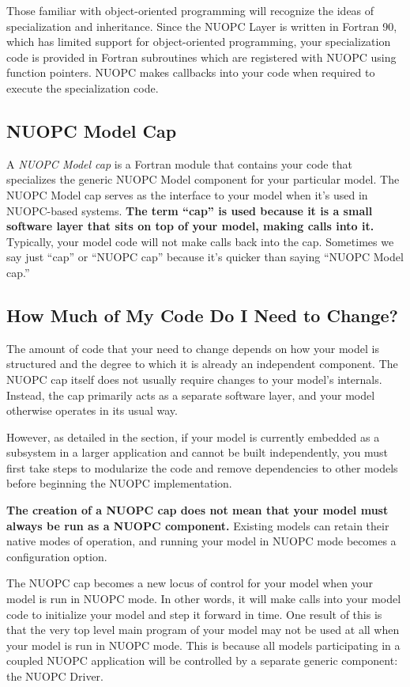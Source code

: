 Those familiar with object-oriented programming will recognize
the ideas of specialization and inheritance.  Since the NUOPC Layer
is written in Fortran 90, which has limited support for
object-oriented programming, your specialization code is
provided in Fortran subroutines which are registered with
NUOPC using function pointers.  NUOPC makes callbacks into
your code when required to execute the specialization code.


\subsection{NUOPC Model Cap}
A \emph{NUOPC Model cap} is a Fortran module that contains your code
that specializes the generic NUOPC Model component for your
particular model.  The NUOPC Model cap serves as the interface
to your model when it's used in NUOPC-based systems.
\textbf{The term ``cap'' is used because it is
a small software layer that sits on top of your model, making
calls into it.}  Typically, your model code will not make calls
back into the cap.  Sometimes we say just ``cap'' or ``NUOPC cap''
because it's quicker than saying ``NUOPC Model cap.''


\subsection{How Much of My Code Do I Need to Change?}
The amount of code that your need to change depends on how your
model is structured and the degree to which it is already an
independent component.  The NUOPC cap itself does not usually require
changes to your model's internals.  Instead, the cap primarily
acts as a separate software layer, and your model otherwise
operates in its usual way.

However, as detailed in the  section,
if your model is currently embedded as a subsystem in a larger
application and cannot be built independently, you must first take
steps to modularize the code and remove dependencies to other
models before beginning the NUOPC implementation.

\textbf{The creation of a NUOPC cap does not mean that your
model must always be run as a NUOPC component.}  Existing models can
retain their native modes of operation, and running your model in
NUOPC mode becomes a configuration option.

The NUOPC cap becomes a new locus of control for your model when
your model is run in NUOPC mode. In other words, it will make calls into your
model code to initialize your model and step it forward in time.
One result of this is that the very top level main program of
your model may not be used at all when your model is run in
NUOPC mode.  This is because all models participating in a coupled
NUOPC application will be controlled by a separate generic component:
the NUOPC Driver.

